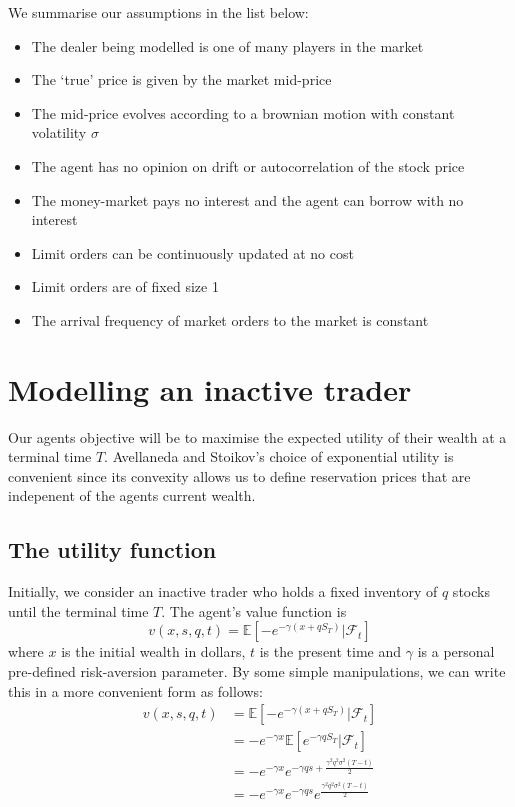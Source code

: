 We summarise our assumptions in the list below:

\begin{itemize}
    \item The dealer being modelled is one of many players in the market
    \item The `true' price is given by the market mid-price
    \item The mid-price evolves according to a brownian motion with constant volatility $\sigma$
    \item The agent has no opinion on drift or autocorrelation of the stock price
    \item The money-market pays no interest and the agent can borrow with no interest
    \item Limit orders can be continuously updated at no cost
    \item Limit orders are of fixed size 1
    \item The arrival frequency of market orders to the market is constant
\end{itemize}

\section{Modelling an inactive trader}\label{sec:3.3}

Our agents objective will be to maximise the expected utility of their wealth at 
a terminal time $T$. Avellaneda and Stoikov's choice of exponential utility is 
convenient since its convexity allows us to define reservation prices that are 
indepenent of the agents current wealth.

\subsection*{The utility function}

Initially, we consider an inactive trader who holds a fixed inventory of $q$ stocks 
until the terminal time $T.$ The agent's value function is
\begin{equation}\label{eq:3.1}
    v(x,s,q,t)=\mathbb{E}\left[-e^{-\gamma(x+qS_T)}|\mathcal{F}_t\right]
\end{equation}
where $x$ is the initial wealth in dollars, $t$ is the present time and $\gamma$ is 
a personal pre-defined risk-aversion parameter. By some simple manipulations, we can 
write this in a more convenient form as follows:
\begin{align*}
    v(x,s,q,t)&=\mathbb{E}\left[-e^{-\gamma(x+qS_T)}|\mathcal{F}_t\right]\\
    &=-e^{-\gamma x}\mathbb{E}\left[e^{-\gamma q S_T}|\mathcal{F}_t\right]\\
    &=-e^{-\gamma x}e^{-\gamma q s + \frac{\gamma^2q^2\sigma^2(T-t)}{2}}\\
    &=-e^{-\gamma x}e^{-\gamma q s}e^{\frac{\gamma^2q^2\sigma^2(T-t)}{2}}
\end{align*}

